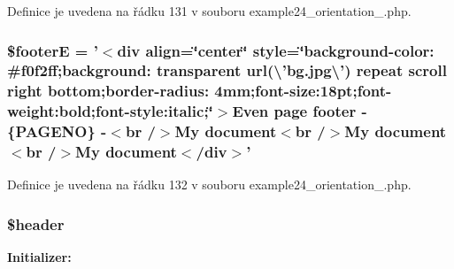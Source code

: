 Definice je uvedena na řádku 131 v souboru example24\-\_\-orientation\-\_.\-php.

\hypertarget{example24__orientation__2_8php_a11a5e15badebbec27b59acdf150c2a63}{
\subsubsection[{\$footer\-E}]{\setlength{\rightskip}{0pt plus 5cm}\$footer\-E = '$<$div align=\char`\"{}center\char`\"{} style=\char`\"{}background-\/color\-: \#f0f2ff;background\-: transparent url(\textbackslash{}'bg.\-jpg\textbackslash{}') repeat scroll right bottom;border-\/radius\-: 4mm;font-\/size\-:18pt;font-\/weight\-:bold;font-\/style\-:italic;\char`\"{}$>$\-Even page footer -\/ \{\-P\-A\-G\-E\-N\-O\} -\/$<$br /$>$\-My document$<$br /$>$\-My document$<$br /$>$\-My document$<$/div$>$'}}\label{example24__orientation__2_8php_a11a5e15badebbec27b59acdf150c2a63}


Definice je uvedena na řádku 132 v souboru example24\-\_\-orientation\-\_.\-php.

\hypertarget{example24__orientation__2_8php_a4f44601f2b9dc8a1644bce53c94ce622}{
\subsubsection[{\$header}]{\setlength{\rightskip}{0pt plus 5cm}\$header}}\label{example24__orientation__2_8php_a4f44601f2b9dc8a1644bce53c94ce622}
{\bfseries Initializer\-:}


